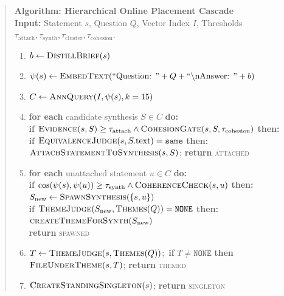 \documentclass{article}
\begin{document}
\begin{quote}
\small
\textbf{Algorithm: Hierarchical Online Placement Cascade}\\
\textbf{Input:} Statement $s$, Question $Q$, Vector Index $I$, Thresholds $\tau_{\mathrm{attach}}, \tau_{\mathrm{synth}}, \tau_{\mathrm{cluster}}, \tau_{\mathrm{cohesion}}$.

\begin{enumerate}[label=\arabic*.]
\item $b \leftarrow \textsc{DistillBrief}(s)$
\item $\psi(s) \leftarrow \textsc{EmbedText}(\text{``Question: ''} + Q + \text{``}\backslash\text{nAnswer: ''} + b)$
\item $C \leftarrow \textsc{AnnQuery}(I, \psi(s), k=15)$
\item \textbf{for each} candidate synthesis $S \in C$ \textbf{do:}\\
\hspace*{1em}\textbf{if} $\textsc{Evidence}(s,S) \geq \tau_{\mathrm{attach}} \wedge \textsc{CohesionGate}(s,S,\tau_{\mathrm{cohesion}})$ \textbf{then:}\\
\hspace*{2em}\textbf{if} $\textsc{EquivalenceJudge}(s, S.\mathrm{text}) = \texttt{same}$ \textbf{then:}\\
\hspace*{3em}$\textsc{AttachStatementToSynthesis}(s,S)$; \textbf{return} \textsc{attached}
\item \textbf{for each} unattached statement $u \in C$ \textbf{do:}\\
\hspace*{1em}\textbf{if} $\cos(\psi(s),\psi(u)) \geq \tau_{\mathrm{synth}} \wedge \textsc{CoherenceCheck}(s,u)$ \textbf{then:}\\
\hspace*{2em}$S_{\mathrm{new}} \leftarrow \textsc{SpawnSynthesis}(\{s,u\})$\\
\hspace*{2em}\textbf{if} $\textsc{ThemeJudge}(S_{\mathrm{new}}, \textsc{Themes}(Q)) = \texttt{NONE}$ \textbf{then:}\\
\hspace*{3em}$\textsc{createThemeForSynth}(S_{\mathrm{new}})$\\
\hspace*{2em}\textbf{return} \textsc{spawned}
\item $T \leftarrow \textsc{ThemeJudge}(s, \textsc{Themes}(Q))$;\ \textbf{if} $T \neq \texttt{NONE}$ \textbf{then} $\textsc{FileUnderTheme}(s,T)$; \textbf{return} \textsc{themed}
\item $\textsc{CreateStandingSingleton}(s)$; \textbf{return} \textsc{singleton}
\end{enumerate}
\end{quote}
\end{document}
